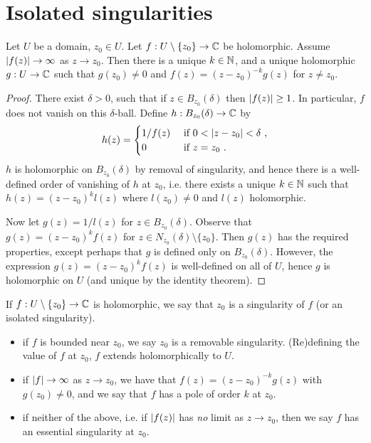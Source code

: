 \section{Isolated singularities}

\begin{proposition}
Let $U$ be a domain, $z_0 \in U$.
Let $f : U \setminus \{ z_0 \} \rightarrow \mathbb{C}$ be holomorphic.
Assume $\lvert f(z)\rvert \rightarrow \infty$ as $z \rightarrow z_0$.
Then there is a unique $k \in \mathbb{N}$, and a unique holomorphic $g : U \rightarrow \mathbb{C}$ such that $g(z_0) \neq 0$ and $f(z) = (z- z_0)^{-k}g(z)$ for $z \neq z_0$.
\end{proposition}

\begin{proof}
There exist $\delta > 0$, such that if $z \in B_{z_0} (\delta)$ then $\lvert f(z)\rvert \geq 1$.
In particular, $f$ does not vanish on this $\delta$-ball.
Define $h : B_{z_0}(\delta) \rightarrow \mathbb{C}$ by
\[
h(z) = \begin{cases} 1/f(z) & \text{ if } 0 < \lvert z - z_0\rvert < \delta \ \text{,} \\ 0 & \text{ if } z = z_0 \ \text{.} \end{cases}
\]
$h$ is holomorphic on $B_{z_0}(\delta)$ by removal of singularity, and hence there is a well-defined order of vanishing of $h$ at $z_0$, i.e. there exists a unique $k \in \mathbb{N}$ such that $h(z) = (z - z_0)^kl(z)$ where $l(z_0) \neq 0$ and $l(z)$ holomorphic.

Now let $g(z) = 1/l(z)$ for $z \in B_{z_0}(\delta)$.
Observe that $g(z) = (z-z_0)^k f(z)$ for $z \in N_{z_0}(\delta) \setminus \{ z_0 \}$.
Then $g(z)$ has the required properties, except perhaps that $g$ is defined only on $B_{z_0}(\delta)$.
However, the expression $g(z) = (z  - z_0)^k f(z)$ is well-defined on all of $U$, hence $g$ is holomorphic on $U$ (and unique by the identity theorem).

\end{proof}

\begin{definition}
  If $f : U \setminus \{ z_0 \} \rightarrow \mathbb{C}$ is holomorphic, we say that $z_0$ is a singularity of $f$ (or an isolated singularity).

  \begin{itemize}
  \item if $f$ is bounded near $z_0$, we say $z_0$ is a removable singularity. (Re)defining the value of $f$ at $z_0$, $f$ extends holomorphically to $U$.
  \item if $\lvert f\rvert \rightarrow \infty$ as $z \rightarrow z_0$, we have that $f(z) = (z - z_0)^{-k}g(z)$ with  $g(z_0) \neq 0$, and we say that $f$ has a pole of order $k$ at $z_0$.
  \item if neither of the above, i.e. if $\lvert f(z)\rvert$ has \emph{no} limit as $z \rightarrow z_0$, then we say $f$ has an essential singularity at $z_0$.
  \end{itemize}
\end{definition}

